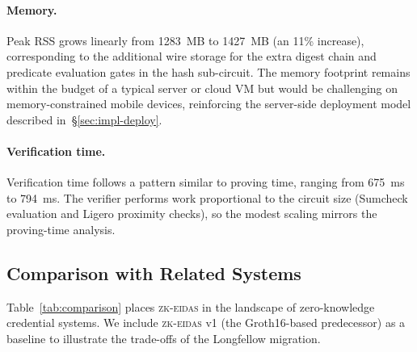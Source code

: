 \paragraph{Memory.}
Peak RSS grows linearly from 1283~MB to 1427~MB (an 11\% increase), corresponding to the additional wire storage for the extra digest chain and predicate evaluation gates in the hash sub-circuit.
The memory footprint remains within the budget of a typical server or cloud VM but would be challenging on memory-constrained mobile devices, reinforcing the server-side deployment model described in~\S\ref{sec:impl-deploy}.

\paragraph{Verification time.}
Verification time follows a pattern similar to proving time, ranging from 675~ms to 794~ms.
The verifier performs work proportional to the circuit size (Sumcheck evaluation and Ligero proximity checks), so the modest scaling mirrors the proving-time analysis.

\subsection{Comparison with Related Systems}\label{sec:bench-comparison}

Table~\ref{tab:comparison} places \textsc{zk-eidas} in the landscape of zero-knowledge credential systems.
We include \textsc{zk-eidas} v1 (the Groth16-based predecessor) as a baseline to illustrate the trade-offs of the Longfellow migration.

